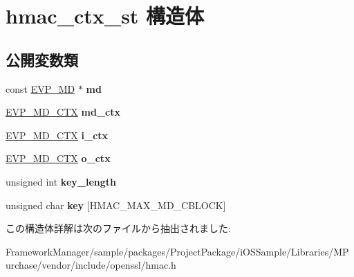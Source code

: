 \hypertarget{structhmac__ctx__st}{}\section{hmac\+\_\+ctx\+\_\+st 構造体}
\label{structhmac__ctx__st}
\subsection*{公開変数類}
\begin{DoxyCompactItemize}
\item 
\hypertarget{structhmac__ctx__st_a9aaff763ed7d862ad49ffa19073deac5}{}const \hyperlink{structenv__md__st}{E\+V\+P\+\_\+\+M\+D} $\ast$ {\bfseries md}\label{structhmac__ctx__st_a9aaff763ed7d862ad49ffa19073deac5}

\item 
\hypertarget{structhmac__ctx__st_a47d4d66a70519722df931e144dbc77a0}{}\hyperlink{structenv__md__ctx__st}{E\+V\+P\+\_\+\+M\+D\+\_\+\+C\+T\+X} {\bfseries md\+\_\+ctx}\label{structhmac__ctx__st_a47d4d66a70519722df931e144dbc77a0}

\item 
\hypertarget{structhmac__ctx__st_aa702847295c2c2c40f6093936b89a829}{}\hyperlink{structenv__md__ctx__st}{E\+V\+P\+\_\+\+M\+D\+\_\+\+C\+T\+X} {\bfseries i\+\_\+ctx}\label{structhmac__ctx__st_aa702847295c2c2c40f6093936b89a829}

\item 
\hypertarget{structhmac__ctx__st_a9ac033d3f121ddbb6329e68825318ad8}{}\hyperlink{structenv__md__ctx__st}{E\+V\+P\+\_\+\+M\+D\+\_\+\+C\+T\+X} {\bfseries o\+\_\+ctx}\label{structhmac__ctx__st_a9ac033d3f121ddbb6329e68825318ad8}

\item 
\hypertarget{structhmac__ctx__st_a7330fd76130fea0171458261bfc11226}{}unsigned int {\bfseries key\+\_\+length}\label{structhmac__ctx__st_a7330fd76130fea0171458261bfc11226}

\item 
\hypertarget{structhmac__ctx__st_a67cdff832dfb8cf2bf7affb9634ef82a}{}unsigned char {\bfseries key} \mbox{[}H\+M\+A\+C\+\_\+\+M\+A\+X\+\_\+\+M\+D\+\_\+\+C\+B\+L\+O\+C\+K\mbox{]}\label{structhmac__ctx__st_a67cdff832dfb8cf2bf7affb9634ef82a}

\end{DoxyCompactItemize}


この構造体詳解は次のファイルから抽出されました\+:\begin{DoxyCompactItemize}
\item 
Framework\+Manager/sample/packages/\+Project\+Package/i\+O\+S\+Sample/\+Libraries/\+M\+Purchase/vendor/include/openssl/hmac.\+h\end{DoxyCompactItemize}
